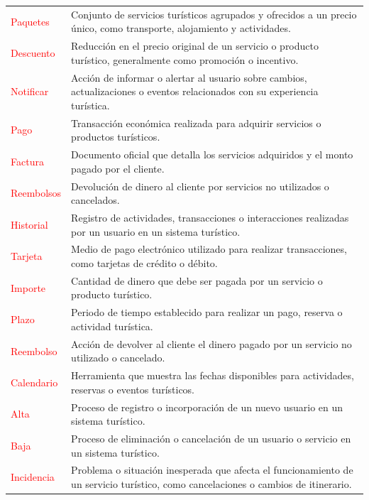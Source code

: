 \newpage
\begin{center}
    \begin{tabular}{p{4cm} p{11cm}}
        \textcolor{red}{Paquetes} & Conjunto de servicios turísticos agrupados y ofrecidos a un precio único, como transporte, alojamiento y actividades. \\
        \textcolor{red}{Descuento} & Reducción en el precio original de un servicio o producto turístico, generalmente como promoción o incentivo. \\
        \textcolor{red}{Notificar} & Acción de informar o alertar al usuario sobre cambios, actualizaciones o eventos relacionados con su experiencia turística. \\
        \textcolor{red}{Pago} & Transacción económica realizada para adquirir servicios o productos turísticos. \\
        \textcolor{red}{Factura} & Documento oficial que detalla los servicios adquiridos y el monto pagado por el cliente. \\
        \textcolor{red}{Reembolsos} & Devolución de dinero al cliente por servicios no utilizados o cancelados. \\
        \textcolor{red}{Historial} & Registro de actividades, transacciones o interacciones realizadas por un usuario en un sistema turístico. \\
        \textcolor{red}{Tarjeta} & Medio de pago electrónico utilizado para realizar transacciones, como tarjetas de crédito o débito. \\
        \textcolor{red}{Importe} & Cantidad de dinero que debe ser pagada por un servicio o producto turístico. \\
        \textcolor{red}{Plazo} & Periodo de tiempo establecido para realizar un pago, reserva o actividad turística. \\
        \textcolor{red}{Reembolso} & Acción de devolver al cliente el dinero pagado por un servicio no utilizado o cancelado. \\
        \textcolor{red}{Calendario} & Herramienta que muestra las fechas disponibles para actividades, reservas o eventos turísticos. \\
        \textcolor{red}{Alta} & Proceso de registro o incorporación de un nuevo usuario en un sistema turístico. \\
        \textcolor{red}{Baja} & Proceso de eliminación o cancelación de un usuario o servicio en un sistema turístico. \\
        \textcolor{red}{Incidencia} & Problema o situación inesperada que afecta el funcionamiento de un servicio turístico, como cancelaciones o cambios de itinerario. \\
    \end{tabular}
\end{center}




